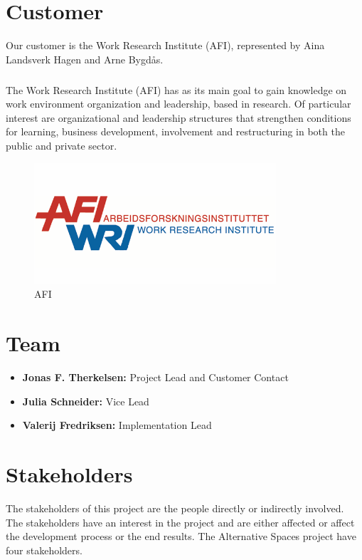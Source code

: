 \section{Customer}
Our customer is the Work Research Institute (AFI), represented by Aina Landsverk Hagen and Arne Bygd\aa s.
\subparagraph{}The Work Research Institute (AFI) has as its main goal to gain knowledge on work environment organization and leadership, based in research. Of particular interest are organizational and leadership structures that strengthen conditions for learning, business development, involvement and restructuring in both the public and private sector.\\
\begin{figure}[ht!]
\centering
\includegraphics[width=90mm]{./Introduction/img/afi.png}
\caption{AFI \label{overflow}}
\end{figure}

\section{Team}
\begin{itemize}
\item \textbf{Jonas F. Therkelsen:} Project Lead and Customer Contact
\item \textbf{Julia Schneider:} Vice Lead
\item \textbf{Valerij Fredriksen:} Implementation Lead
\end{itemize}

\section{Stakeholders}

The stakeholders of this project are the people directly or indirectly involved. The stakeholders have an interest in the project and are either affected or affect the development process or the end results. The Alternative Spaces project have four stakeholders. 

